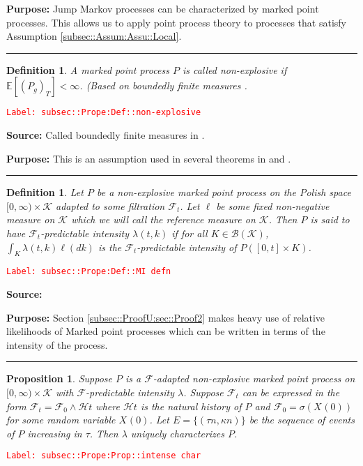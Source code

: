 \documentclass[12pt]{article}
\newcommand{\mb}{\mathbb}
\newcommand{\mc}{\mathcal}
\newcommand{\ms}{\mathscr}
\newcommand{\tr}{\textcolor{red}}
\newcommand{\labe}[1]{\tr{\texttt{Label: #1}}}
\newcommand{\purpose}{\textbf{Purpose: }}
\newcommand{\lin}{\rule{\linewidth}{0.4 pt}}
\newcommand{\ex}[1]{\mb{E}\left[#1\right]}			%
\renewcommand{\t}{t}							%
\newcommand{\F}{\mc{F}}							%
\newcommand{\FH}{\mc{H}}						%
\newcommand{\X}{X}								%
\newcommand{\cind}[1]{_{#1}}					%
\newcommand{\tp}[1]{(#1)}						%
\newcommand{\ts}[1]{_{#1}}						%
\newcommand{\rate}{\lambda}						%
\newcommand{\rt}{\tau}							%
\renewcommand{\mark}{\kappa}					%
\newcommand{\rp}{P}								%
\newcommand{\mspce}{\mc{K}}						%
\newcommand{\rpg}{\rp_g}						%
\newtheorem{prop}[thms]{Proposition}
\newtheorem{defn}[thms]{Definition}
\begin{document}
\purpose Jump Markov processes can be characterized by marked point processes. This allows us to apply point process theory to processes that satisfy Assumption \ref{subsec::Assum:Assu::Local}.

\lin

\begin{defn}
A marked point process \(\rp\) is called non-explosive if \(\ex{(\rpg)_T} < \infty\). (Based on boundedly finite measures \cite[Definition 9.1.I]{DalVer08}.
\label{subsec::Prope:Def::non-explosive}
\end{defn}
\labe{subsec::Prope:Def::non-explosive}

\textbf{Source: } Called boundedly finite measures in \cite[Definition 9.1.I]{DalVer08}.

\purpose This is an assumption used in several theorems in \cite{DalVer03} and \cite{DalVer08}.

\lin

\begin{defn}
Let \(\rp\) be a non-explosive marked point process on the Polish space \([0,\infty)\times \mspce\) adapted to some filtration \(\F\ts{\t}\). Let \(\ell\) be some fixed non-negative measure on \(\mspce\) which we will call the reference measure on \(\mspce\). Then \(\rp\) is said to have \(\F\ts{\t}\)-predictable intensity \(\rate(\t,k)\) if for all \(K \in \ms{B}(\mspce)\), \(\int_K \rate(\t,k)\ell(dk)\) is the \(\F\ts{\t}\)-predictable intensity of \(\rp([0,\t]\times K)\). 
\label{subsec::Prope:Def::MI defn}
\end{defn}
\labe{subsec::Prope:Def::MI defn}

\textbf{Source: }\cite[Definition 14.3.I]{DalVer08}

\purpose Section \ref{subsec::ProofU:sec::Proof2} makes heavy use of relative likelihoods of Marked point processes which can be written in terms of the intensity of the process.

\lin

\begin{prop}
Suppose \(\rp\) is a \(\F\)-adapted non-explosive marked point process on \([0,\infty)\times \mspce\) with \(\F\)-predictable intensity \(\rate\). Suppose \(\F\ts{\t}\) can be expressed in the form \(\F\ts{\t} = \F\ts{0}\wedge \FH{\t}\) where \(\FH{\t}\) is the natural history of \(\rp\) and \(\F\ts{0} = \sigma(\X\cind{}\tp{0})\) for some random variable \(\X\cind{}\tp{0}\). Let \(E = \{(\rt{n},\mark{n})\}\) be the sequence of events of \(\rp\) increasing in \(\rt\). Then \(\rate\) uniquely characterizes \(\rp\).
\label{subsec::Prope:Prop::intense char}
\end{prop}
\labe{subsec::Prope:Prop::intense char}
\end{document}
